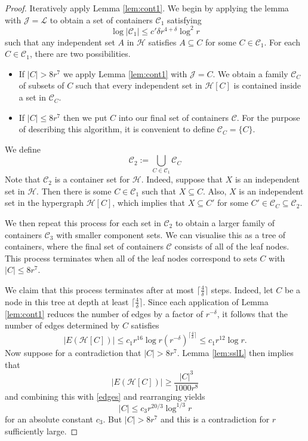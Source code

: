 \documentclass[11pt]{amsart}
\newcommand{\cL}{\mathcal{L}}
\newcommand{\cH}{\mathcal{H}}
\newcommand{\cJ}{\mathcal{J}}
\newcommand{\cC}{\mathcal{C}}
\newcommand{\orn}[1]{{\color{red} #1}}
\theoremstyle{remark}
\begin{document}
\begin{proof}



    Iteratively apply Lemma \ref{lem:cont1}. We begin by applying the lemma with $\cJ=\cL$ to obtain a set of containers $\cC_{1}$ satisfying 
    \[
    \log | \cC_1| \leq c' \delta r^{4+\delta} \log^2 r
    \]
    such that any independent set $A$ in $\cH$ satisfies $A \subseteq C$ for some $C \in \cC_{1}$. For each $C \in \cC_{1}$, there are two possibilities.
    \begin{itemize}
    \item If $|C| > 8r^7$ we apply Lemma \ref{lem:cont1} with $\cJ=C$. We obtain a family $\cC_{C}$ of subsets of $C$ such that every independent set in $\cH[C]$ is contained inside a set in $\cC_{C}$.
        \item If $|C| \leq 8r^7$ then we put $C$ into our final set of containers $\cC$. For the purpose of describing this algorithm, it is convenient to define $\cC_{C}= \{ C \}$.
    \end{itemize}
We define 
\[
\cC_2:= \bigcup_{C \in \cC_1} \cC_C
\]
Note that $\mathcal C_2$ is a container set for $\cH$. Indeed, suppose that $X$ is an independent set in $\cH$. Then there is some $C \in \mathcal C_1$ such that $X \subseteq C$. Also, $X$ is an independent set in the hypergraph $\cH[C]$, which implies that $X \subseteq C'$ for some $C' \in \mathcal C_C \subseteq \mathcal C_2$.
    
    We then repeat this process for each set in $\cC_2$ to obtain a larger family of containers $\cC_3$ with smaller component sets. We can visualise this as a tree of containers, where the final set of containers $\cC$ consists of all of the leaf nodes. This process terminates when all of the leaf nodes correspond to sets $C$ with $|C| \leq 8r^7$. 
    
    We claim that this process terminates after at most $\lceil \frac{4}{\delta} \rceil$ steps. Indeed, let $C$ be a node in this tree at depth at least $\lceil \frac{4}{\delta}\rceil $. Since each application of Lemma \ref{lem:cont1} reduces the number of edges by a factor of $r^{-\delta}$, it follows that the number of edges determined by $C$ satisfies
    \begin{equation} \label{edges}
    |E(\cH[C])| \leq c_1r^{16} \log r(r^{-\delta})^{\lceil \frac{4}{\delta}\rceil }\leq c_1r^{12} \log r.
    \end{equation}
     Now suppose for a contradiction that $|C| > 8r^7$. Lemma \ref{lem:sslL} then implies that
    \[
   | E(\cH[C])| \geq \frac{|C|^3}{1000r^8}
    \]
    and combining this with \eqref{edges} and rearranging yields
    \[
    |C| \leq c_3 r^{20/3} \log^{1/3} r
    \]
    for an absolute constant $c_3$. But $|C| > 8r^7$ and this is a contradiction for $r$ sufficiently large.


\end{proof}
\end{document}
